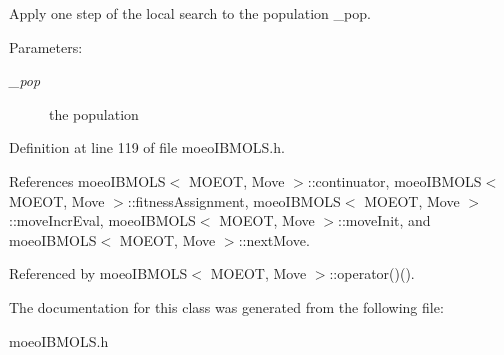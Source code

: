 Apply one step of the local search to the population \_\-pop. 

\begin{Desc}
\item[Parameters:]
\begin{description}
\item[{\em \_\-pop}]the population \end{description}
\end{Desc}


Definition at line 119 of file moeo\-IBMOLS.h.

References moeo\-IBMOLS$<$ MOEOT, Move $>$::continuator, moeo\-IBMOLS$<$ MOEOT, Move $>$::fitness\-Assignment, moeo\-IBMOLS$<$ MOEOT, Move $>$::move\-Incr\-Eval, moeo\-IBMOLS$<$ MOEOT, Move $>$::move\-Init, and moeo\-IBMOLS$<$ MOEOT, Move $>$::next\-Move.

Referenced by moeo\-IBMOLS$<$ MOEOT, Move $>$::operator()().

The documentation for this class was generated from the following file:\begin{CompactItemize}
\item 
moeo\-IBMOLS.h\end{CompactItemize}
